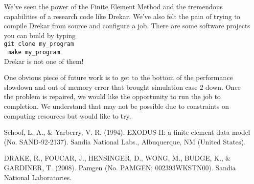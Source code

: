 \documentclass[11pt]{article} %
\newcommand{\tty}[1]{\texttt{#1}}
\begin{document}
We've seen the power of the Finite Element Method and the tremendous capabilities of 
a research code like Drekar.  
We've also felt the pain of trying to compile Drekar from source and configure a job.
There are some software projects you can build by typing\\
\tty{git clone my\_program}\\
\tty{ make my\_program} \\
Drekar is not one of them!

One obvious piece of future work is to get to the bottom of the performance slowdown 
and out of memory error that brought simulation case 2 down.
Once the problem is repaired, we would like the opportunity to run the job to completion.
We understand that may not be possible due to constraints on computing resources
but would like to try.


\begin{thebibliography}{9}
Schoof, L. A., \& Yarberry, V. R. (1994). EXODUS II: a finite element data model (No. SAND-92-2137). Sandia National Labs., Albuquerque, NM (United States).

DRAKE, R., FOUCAR, J., HENSINGER, D., WONG, M., BUDGE, K., \& GARDINER, T. (2008). Pamgen (No. PAMGEN; 002393WKSTN00). Sandia National Laboratories.

\end{thebibliography}
\end{document}
